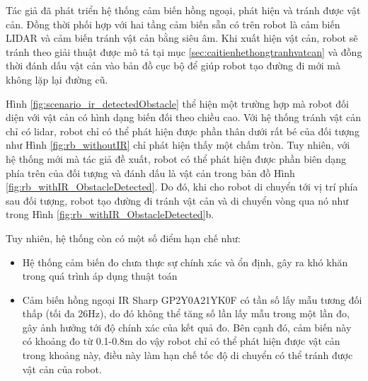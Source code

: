 Tác giả đã phát triển hệ thống cảm biến hồng ngoại, phát hiện và tránh được vật cản. Đồng thời phối hợp với hai tầng cảm biến sẵn có trên robot là cảm biến LIDAR và cảm biến tránh vật cản bằng siêu âm. Khi xuất hiện vật cản, robot sẽ tránh theo giải thuật được mô tả tại mục \ref{sec:caitienhethongtranhvatcan} và đồng thời đánh dấu vật cản vào bản đồ cục bộ để giúp robot tạo đường đi mới mà không lặp lại đường cũ.

Hình \ref{fig:scenario_ir_detectedObstacle} thể hiện một trường hợp mà robot đối diện với vật cản có hình dạng biến đối theo chiều cao. Với hệ thống tránh vật cản chỉ có lidar, robot chỉ có thể phát hiện được phần thân dưới rất bé của đối tượng như Hình \ref{fig:rb_withoutIR} chỉ phát hiện thấy một chấm tròn. Tuy nhiên, với hệ thống mới mà tác giả đề xuất, robot có thể phát hiện được phần biên dạng phía trên của đối tượng và đánh dấu là vật cản trong bản đồ Hình \ref{fig:rb_withIR_ObstacleDetected}. Do đó, khi cho robot di chuyển tới vị trí phía sau đối tượng, robot tạo đường đi tránh vật cản và di chuyển vòng qua nó như trong Hình \ref{fig:rb_withIR_ObstacleDetected}b.

Tuy nhiên, hệ thống còn có một số điểm hạn chế như:
\begin{itemize}
    \item Hệ thống cảm biến đo chưa thực sự chính xác và ổn định, gây ra khó khăn trong quá trình áp dụng thuật toán
    \item Cảm biến hồng ngoại IR Sharp GP2Y0A21YK0F có tần số lấy mẫu tương đối thấp (tối đa 26Hz), do đó không thể tăng số lần lấy mẫu trong một lần đo, gây ảnh hưởng tới độ chính xác của kết quả đo. Bên cạnh đó, cảm biến này có khoảng đo từ 0.1-0.8m do vậy robot chỉ có thể phát hiện được vật cản trong khoảng này, điều này làm hạn chế tốc độ di chuyển có thể tránh được vật cản của robot.
\end{itemize}



